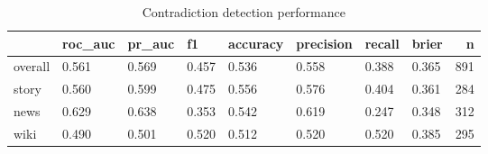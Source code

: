\begin{table}
\caption{Contradiction detection performance}
\label{tab:results}
\begin{tabular}{llllllllr}
\toprule
 & roc_auc & pr_auc & f1 & accuracy & precision & recall & brier & n \\
\midrule
overall & 0.561 & 0.569 & 0.457 & 0.536 & 0.558 & 0.388 & 0.365 & 891 \\
story & 0.560 & 0.599 & 0.475 & 0.556 & 0.576 & 0.404 & 0.361 & 284 \\
news & 0.629 & 0.638 & 0.353 & 0.542 & 0.619 & 0.247 & 0.348 & 312 \\
wiki & 0.490 & 0.501 & 0.520 & 0.512 & 0.520 & 0.520 & 0.385 & 295 \\
\bottomrule
\end{tabular}
\end{table}
